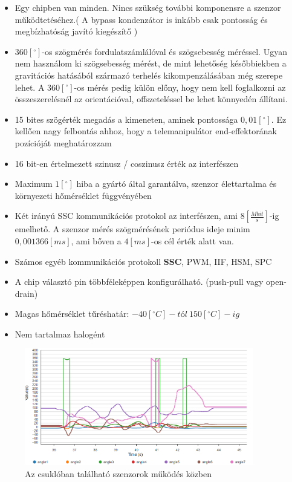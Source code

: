 \begin{itemize}
	\item Egy chipben van minden. Nincs szükség további komponensre a szenzor működtetéséhez.( A bypass kondenzátor is inkább csak pontosság és megbízhatóság javító kiegészítő )
	\item $360[^{\circ}]$-os szögmérés fordulatszámlálóval és szögsebesség méréssel. Ugyan nem használom ki szögsebesség mérést, de mint lehetőség későbbiekben a gravitációs hatásából származó terhelés kikompenzálásában még szerepe lehet. A $360[^{\circ}]$-os mérés pedig külön előny, hogy nem kell foglalkozni az összeszerelésnél az orientációval, offszeteléssel be lehet könnyedén állítani.
	\item 15 bites szögérték megadás a kimeneten, aminek pontossága $0,01[^{\circ}]$. Ez kellően nagy felbontás ahhoz, hogy a telemanipulátor end-effektorának pozícióját meghatározzam
	\item 16 bit-en értelmezett szinusz / coszinusz érték az interfészen
	\item Maximum $1[^{\circ}]$ hiba a gyártó által garantálva, szenzor élettartalma és környezeti hőmérséklet függvényében
	\item Két irányú SSC kommunikációs protokol az interfészen, ami $8[\frac{Mbit}{s}]$-ig emelhető. A szenzor mérés szögmérésének periódus ideje minim $0,001366[ms]$, ami bőven a $4[ms]$-os cél érték alatt van.
	\item Számos egyéb kommunikációs protokoll \textbf{SSC}, PWM, IIF, HSM, SPC
	\item A chip választó pin többféleképpen konfigurálható. (push-pull vagy open-drain)
 	\item Magas hőmérséklet tűréshatár: $-40[^{\circ} C]-tól~150[^{\circ} C]-ig$
	\item Nem tartalmaz halogént
\end{itemize}

\begin{figure}[!ht]
\centering
\includegraphics[width=100mm, keepaspectratio]{figures/Csuklo_szog_teszt/szumma}
\caption{Az csuklóban található szenzorok működés közben}
\label{fig:csuklo_teszt_szumma}
\end{figure}

